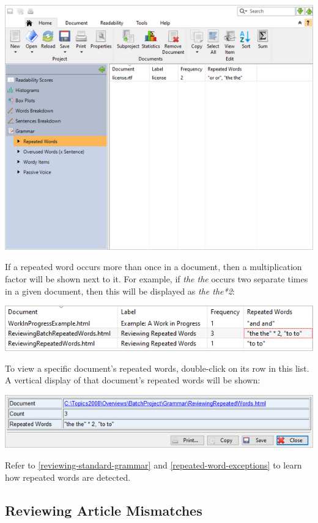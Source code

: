 \documentclass[
]{book}
\theoremstyle{definition}
\theoremstyle{definition}
\theoremstyle{definition}
\theoremstyle{definition}
\theoremstyle{remark}
\begin{document}
\includegraphics{Images/batchrepeatedwords.png}

If a repeated word occurs more than once in a document, then a multiplication factor will be shown next to it. For example, if \emph{the the} occurs two separate times in a given document, then this will be displayed as \emph{the the*2}:

\includegraphics{Images/batchrepeatedmultiple.png}

To view a specific document's repeated words, double-click on its row in this list. A vertical display of that document's repeated words will be shown:

\begin{center}\includegraphics[width=0.75\linewidth,]{Images/batchrepeatedviewitem} \end{center}

Refer to \ref{reviewing-standard-grammar} and \ref{repeated-word-exceptions} to learn how repeated words are detected.

\hypertarget{reviewing-batch-articles}{%
\subsection*{Reviewing Article Mismatches}\label{reviewing-batch-articles}}
\end{document}
